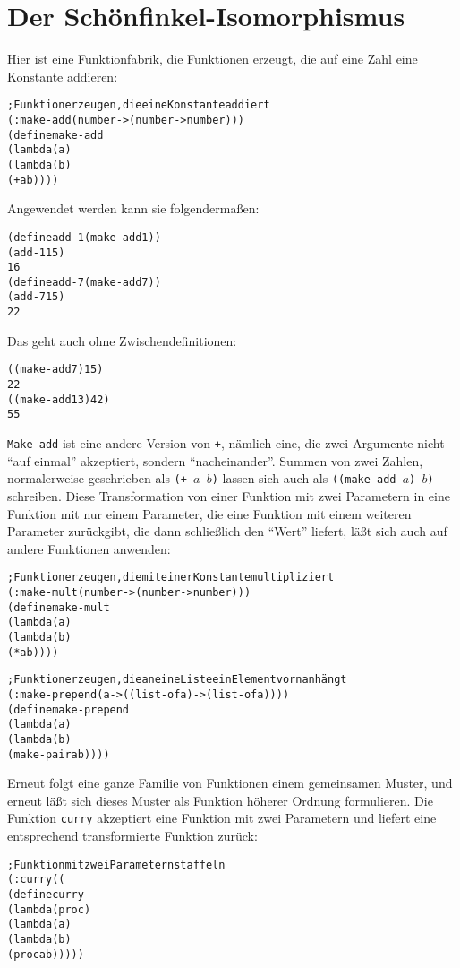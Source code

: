 \section{Der Schönfinkel-Isomorphismus}
\label{sec:currying}
Hier ist eine Funktionfabrik, die Funktionen erzeugt, die auf eine
Zahl eine Konstante addieren:
%
\begin{alltt}
; Funktion erzeugen, die eine Konstante addiert
(: make-add (number -> (number -> number)))
(define make-add
  (lambda (a)
    (lambda (b)
      (+ a b))))
\end{alltt}
%
Angewendet werden kann sie folgendermaßen:
%
\begin{alltt}
(define add-1 (make-add 1))
(add-1 15)
\evalsto{} 16
(define add-7 (make-add 7))
(add-7 15)
\evalsto{} 22
\end{alltt}
%
Das geht auch ohne Zwischendefinitionen:
%
\begin{alltt}
((make-add 7) 15)
\evalsto{} 22
((make-add 13) 42)
\evalsto{} 55
\end{alltt}
%
\texttt{Make-add} ist eine andere Version von \texttt{+}, nämlich
eine, die zwei Argumente nicht "`auf einmal"' akzeptiert, sondern
"`nacheinander"'.  Summen von zwei Zahlen, normalerweise geschrieben
als \texttt{(+ $a$ $b$)} lassen sich auch als \texttt{((make-add $a$)
  $b$)} schreiben.  Diese Transformation von einer Funktion mit zwei
Parametern in eine Funktion mit nur einem Parameter, die eine Funktion
mit einem weiteren Parameter zurückgibt, die dann schließlich den "`Wert"'
liefert, läßt sich auch auf andere Funktionen anwenden:
%
\begin{alltt}
; Funktion erzeugen, die mit einer Konstante multipliziert
(: make-mult (number -> (number -> number)))
(define make-mult
  (lambda (a)
    (lambda (b)
      (* a b))))

; Funktion erzeugen, die an eine Liste ein Element vorn anhängt
(: make-prepend (a -> ((list-of a) -> (list-of a))))
(define make-prepend
  (lambda (a)
    (lambda (b)
      (make-pair a b))))
\end{alltt}
%
Erneut folgt eine ganze Familie von Funktionen einem gemeinsamen
Muster, und erneut läßt sich dieses Muster als Funktion höherer
Ordnung formulieren.  Die Funktion \texttt{curry} akzeptiert
eine Funktion mit zwei Parametern und liefert eine entsprechend
transformierte Funktion zurück:
%
\begin{alltt}
; Funktion mit zwei Parametern staffeln
(: curry ((%a %b -> %c) -> (%a -> (%b -> %c))))
(define curry
  (lambda (proc)
    (lambda (a)
      (lambda (b)
        (proc a b)))))
\end{alltt}
